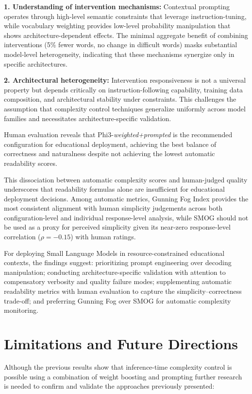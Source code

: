 \documentclass[10pt, a4paper]{article}
\begin{document}
\textbf{1. Understanding of intervention mechanisms:} Contextual prompting operates through high-level semantic constraints that leverage instruction-tuning, while vocabulary weighting provides low-level probability manipulation that shows architecture-dependent effects. The minimal aggregate benefit of combining interventions (5\% fewer words, no change in difficult words) masks substantial model-level heterogeneity, indicating that these mechanisms synergize only in specific architectures.

\textbf{2. Architectural heterogeneity:} Intervention responsiveness is not a universal property but depends critically on instruction-following capability, training data composition, and architectural stability under constraints. This challenges the assumption that complexity control techniques generalize uniformly across model families and necessitates architecture-specific validation.

Human evaluation reveals that Phi3-\textit{weighted+prompted} is the recommended configuration for educational deployment, achieving the best balance of correctness and naturalness despite not achieving the lowest automatic readability scores.

This dissociation between automatic complexity scores and human-judged quality underscores that readability formulas alone are insufficient for educational deployment decisions. Among automatic metrics, Gunning Fog Index provides the most consistent alignment with human simplicity judgements across both configuration-level and individual response-level analysis, while SMOG should not be used as a proxy for perceived simplicity given its near-zero response-level correlation ($\rho=-0.15$) with human ratings.

For deploying Small Language Models in resource-constrained educational contexts, the findings suggest: prioritizing prompt engineering over decoding manipulation; conducting architecture-specific validation with attention to compensatory verbosity and quality failure modes; supplementing automatic readability metrics with human evaluation to capture the simplicity--correctness trade-off; and preferring Gunning Fog over SMOG for automatic complexity monitoring.


\section{Limitations and Future Directions}

Although the previous results show that inference-time complexity control is possible using a combination of weight boosting and prompting further research is needed to confirm and validate the approaches previously presented:
\end{document}
